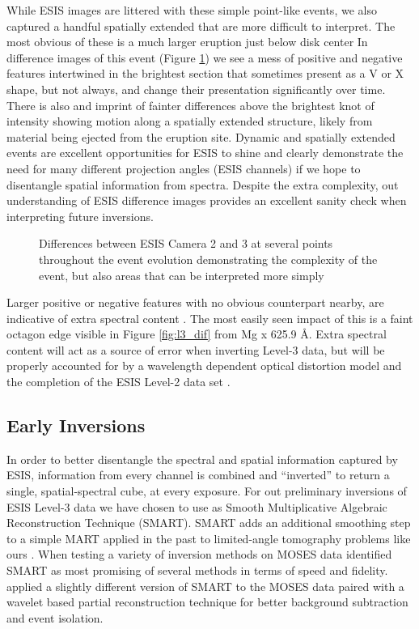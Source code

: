     	While ESIS images are littered with these simple point-like events, we also captured a handful spatially extended that are more difficult to interpret.
    	The most obvious of these is a much larger eruption just below disk center 
    	In difference images of this event (Figure \ref{fig:main_event}) we see a mess of positive and negative features intertwined in the brightest section that sometimes present as a V or X shape, but not always, and change their presentation significantly over time.
    	There is also and imprint of fainter differences above the brightest knot of intensity showing motion along a spatially extended structure, likely from material being ejected from the eruption site.
    	Dynamic and spatially extended events are excellent opportunities for ESIS to shine and clearly demonstrate the need for many different projection angles (ESIS channels) if we hope to disentangle spatial information from spectra.
    	Despite the extra complexity, out understanding of ESIS difference images provides an excellent sanity check when interpreting future inversions.
    	
    	\begin{figure}[htb!]
    		\centering
    		\caption{Differences between ESIS Camera 2 and 3 at several points throughout the event evolution demonstrating the complexity of the event, but also areas that can be interpreted more simply}
    		\label{fig:main_event}
    	\end{figure}
    	
    	Larger positive or negative features with no obvious counterpart nearby, are indicative of extra spectral content \citep{RustPhD,Parker2021}.
    	The most easily seen impact of this is a faint octagon edge visible in Figure \ref{fig:l3_dif} from Mg {\sc x} 625.9 \AA.
    	Extra spectral content will act as a source of error when inverting Level-3 data, but will be properly accounted for by a wavelength dependent optical distortion model and the completion of the ESIS Level-2 data set \citep{Smart2022}. 	
    
    \subsection{Early Inversions}
    	In order to better disentangle the spectral and spatial information captured by ESIS, information from every channel is combined and ``inverted'' to return a single, spatial-spectral cube, at every exposure.
    	For out preliminary inversions of ESIS Level-3 data we have chosen to use as Smooth Multiplicative Algebraic Reconstruction Technique (SMART).
    	SMART adds an additional smoothing step to a simple MART applied in the past to limited-angle tomography problems like ours \citep{Okamoto1991,Verhoeven1993}.
    	When testing a variety of inversion methods on MOSES data \citet{FoxPhD} identified SMART as most promising of several methods in terms of speed and fidelity.
    	\citet{RustPhD} applied a slightly different version of SMART to the MOSES data paired with a wavelet based partial reconstruction technique for better background subtraction and event isolation.
    	
